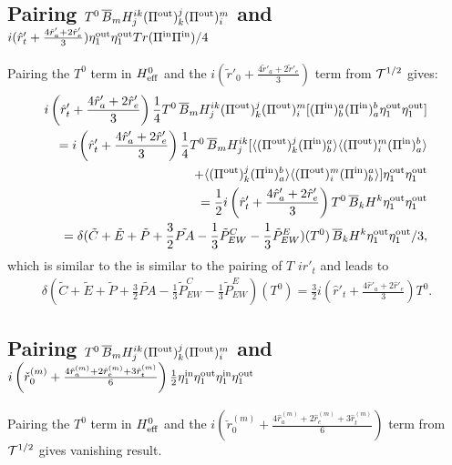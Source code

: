 \documentclass[aps,preprint,floats,epsf,epsfig,nofootinbib,letter]{revtex4}
\newcommand{\be}{\begin{eqnarray}}
\newcommand{\en}{\end{eqnarray}}
\newcommand{\T}{{\cal T}}
\newcommand{\la}{{\langle}}
\newcommand{\ra}{{\rangle}}
\newcommand{\non}{{\nonumber}}
\begin{document}
\subsection{Pairing $T^0\, \overline B_m H^{ik}_j (\Pi^{\rm out})^j_k (\Pi^{\rm out})^m_i$ and 
$i(\hat r'_t +\frac{4\hat r'_a +2\hat r'_e}{3})
\eta^{\rm out}_1\eta^{\rm out}_1Tr(\Pi^{\rm in}\Pi^{\rm in})/4$}
Pairing the $T^0$ term in $H^0_{\rm eff}$ and the $i(\tilde r'_0 +\frac{4\tilde r'_a +2\tilde r'_e}{3})$ term from $\T^{1/2}$ gives:
\be
&&
\hspace{-1cm}
 i\left(\hat r'_t +\frac{4\hat r'_a +2\hat r'_e}{3}\right) \frac{1}{4} T^0\, \overline B_m H^{ik}_j (\Pi^{\rm out})^j_k (\Pi^{\rm out})^m_i 
[(\Pi^{\rm in})^a_b(\Pi^{\rm in})^b_a \eta_1^{\rm out}\eta_1^{\rm out}]
\non\\
&&=i\left(\hat r'_t +\frac{4\hat r'_a +2\hat r'_e}{3}\right) \frac{1}{4} T^0\, \overline B_m H^{ik}_j 
[\la (\Pi^{\rm out})^j_k (\Pi^{\rm in})^a_b\ra
\la (\Pi^{\rm out})^m_i (\Pi^{\rm in})^b_a\ra
\non\\
&&
\quad+
\la (\Pi^{\rm out})^j_k (\Pi^{\rm in})^b_a\ra
\la (\Pi^{\rm out})^m_i (\Pi^{\rm in})^a_b\ra]
\eta^{\rm out}_1\eta^{\rm out}_1
\non\\
&&= \frac{1}{2}i \left(\hat r'_t +\frac{4\hat r'_a +2\hat r'_e}{3}\right) T^0\,\overline B_k H^k \eta_1^{\rm out}\eta^{\rm out}_1
\non\\
&&=\delta(\tilde C+\tilde E+\tilde P +\frac{3}{2}\tilde {PA}-\frac{1}{3}\tilde P^C_{EW} -\frac{1}{3}\tilde P^E_{EW})(T^0)
\,\overline B_k H^k \eta_1^{\rm out}\eta_1^{\rm out}/3,
\en
which is similar to the is similar to the pairing of $T$ $ir'_t$ and leads to
\be
\delta(\tilde C+\tilde E +\tilde P+\frac{3}{2}\tilde {PA}-\frac{1}{3}\tilde P^C_{EW} -\frac{1}{3}\tilde P^E_{EW})(T^0)= \frac{3}{2}i \left(\hat r'_t +\frac{4\hat r'_a +2\hat r'_e}{3}\right) T^0.
\en




\subsection{Pairing $T^0\, \overline B_m H^{ik}_j (\Pi^{\rm out})^j_k (\Pi^{\rm out})^m_i$ and
$i\left(\check r^{(m)}_0+\frac{4\hat r^{(m)}_a+2\hat r^{(m)}_e+3\hat r^{(m)}_t}{6}\right)\frac{1}{2}\eta^{\rm in}_1\eta^{\rm out}_1\eta^{\rm in}_1\eta^{\rm out}_1$
}
Pairing the $T^0$ term in $H^0_{\rm eff}$ and the $i\left(\check r^{(m)}_0+\frac{4\hat r^{(m)}_a+2\hat r^{(m)}_e+3\hat r^{(m)}_t}{6}\right)$ term from $\T^{1/2}$ gives vanishing result.
\end{document}
